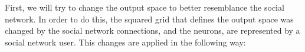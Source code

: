 First, we will try to change the output space to better resemblance the social network. In order to do this, the squared grid that defines the output space was changed by the social network connections, and the neurons, are represented by a social network user. This changes are applied in the following way:
\begin{figure}[htpb]
  \centering
  \hspace*{0.5cm}

\end{figure}
